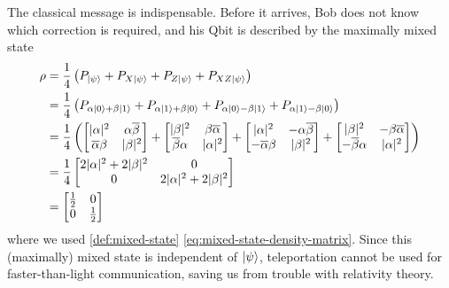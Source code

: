 The classical message is indispensable.
Before it arrives, Bob does not know which correction is required, and his Qbit is described by the maximally mixed state
\[
\begin{aligned}
\rho
&=
\frac{1}{4}
\left(
P_{\ket{\psi}}
+P_{X\ket{\psi}}
+P_{Z\ket{\psi}}
+P_{XZ\ket{\psi}}
\right)
\\
&=
\frac{1}{4}
\left(
P_{\alpha\ket{0}+\beta\ket{1}}
+
P_{\alpha\ket{1}+\beta\ket{0}}
+
P_{\alpha\ket{0}-\beta\ket{1}}
+
P_{\alpha\ket{1}-\beta\ket{0}}
\right)
\\
&=
\frac{1}{4}
\left(
\begin{bmatrix}
|\alpha|^2 & \alpha\overline{\beta} \\
\overline{\alpha}\beta & |\beta|^2
\end{bmatrix}
+
\begin{bmatrix}
|\beta|^2 & \beta\overline{\alpha} \\
\overline{\beta}\alpha & |\alpha|^2
\end{bmatrix}
+
\begin{bmatrix}
|\alpha|^2 & -\alpha\overline{\beta} \\
-\overline{\alpha}\beta & |\beta|^2
\end{bmatrix}
+
\begin{bmatrix}
|\beta|^2 & -\beta\overline{\alpha} \\
-\overline{\beta}\alpha & |\alpha|^2
\end{bmatrix}
\right)
\\
&=
\frac{1}{4}
\begin{bmatrix}
2|\alpha|^2+2|\beta|^2 & 0 \\
0 & 2|\alpha|^2+2|\beta|^2
\end{bmatrix}
\\
&=
\begin{bmatrix}
\frac{1}{2}&0\\
0&\frac{1}{2}
\end{bmatrix}
\end{aligned}
\]
where we used \autoref{def:mixed-state} \eqref{eq:mixed-state-density-matrix}.
Since this (maximally) mixed state is independent of \(\ket{\psi}\),
teleportation cannot be used for faster-than-light communication,
saving us from trouble with relativity theory.

